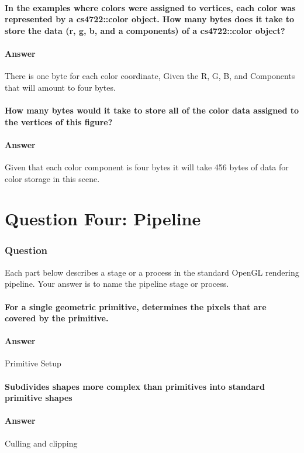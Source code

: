\documentclass{report}
\begin{document}
\subsection{ In the examples where colors were assigned to vertices, each color was represented by a cs4722::color object. How many bytes does it take to store the data (r, g, b, and a components) of a cs4722::color object?}
\subsection{Answer}
There is one byte for each color coordinate, Given the R, G, B, and Components that will amount to four bytes.
\subsection{ How many bytes would it take to store all of the color data assigned to the vertices of this figure?}
\subsection{Answer}
Given that each color component is four bytes it will take 456 bytes of data for color storage in this scene.
\part{Question Four: Pipeline}
\section{Question}
Each part below describes a stage or a process in the standard OpenGL rendering pipeline. Your answer is to name the pipeline stage or process.
\subsection{ For a single geometric primitive, determines the pixels that are covered by the primitive.}
\subsection{Answer}
Primitive Setup
\subsection{ Subdivides shapes more complex than primitives into standard primitive shapes}
\subsection{Answer}
Culling and clipping
\end{document}
